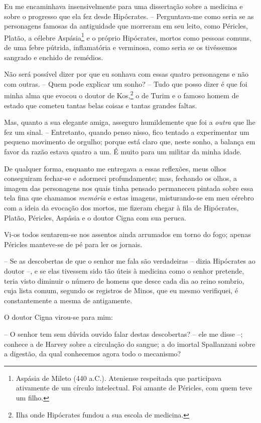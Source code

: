 Eu me encaminhava insensivelmente para uma dissertação sobre a medicina
e sobre o progresso que ela fez desde Hipócrates. -- Perguntava-me
como seria se as personagens famosas da antiguidade que morreram em seu
leito, como Péricles, Platão, a célebre Aspásia\footnote{ Aspásia de
Mileto (440 a.C.). Ateniense respeitada que participava ativamente de um
círculo intelectual. Foi amante de Péricles, com quem teve um
filho.} e o próprio Hipócrates, mortos como pessoas comuns, de uma
febre pútrida, inflamatória e verminosa, como seria se os tivéssemos
sangrado e enchido de remédios. 

Não será possível dizer por que eu sonhava com essas quatro personagens
e não com outras. -- Quem pode explicar um sonho? -- Tudo que posso
dizer é que foi minha alma que evocou o doutor de Kos,\footnote{ Ilha
onde Hipócrates fundou a sua escola de medicina.} o de Turim e o
famoso homem de estado que cometeu tantas belas coisas e tantas grandes faltas.

Mas, quanto a sua elegante amiga, asseguro humildemente que foi a
\textit{outra} que lhe fez um sinal. -- Entretanto, quando penso
nisso, fico tentado a experimentar um pequeno movimento de orgulho;
porque está claro que, neste sonho, a balança em favor da razão estava
quatro a um. É muito para um militar da minha idade. 

 De qualquer forma, enquanto me entregava a essas reflexões, meus olhos
conseguiram fechar-se e adormeci profundamente; mas, fechando os olhos,
a imagem das personagens nos quais tinha pensado permaneceu pintada
sobre essa tela fina que chamamos \textit{memória} e estas imagens,
misturando-se em meu cérebro com a ideia da evocação dos mortos, me
fizeram chegar à fila de Hipócrates, Platão, Péricles, Aspásia e o
doutor Cigna com sua peruca.

 Vi-os todos sentarem-se nos assentos ainda arrumados em torno do fogo;
apenas Péricles manteve-se de pé para ler os jornais. 

 -- Se as descobertas de que o senhor me fala são verdadeiras -- dizia
Hipócrates ao doutor --, e se elas tivessem sido tão úteis à medicina como
o senhor pretende, teria visto diminuir o número de homens que desce
cada dia ao reino sombrio, cuja lista comum, segundo os registros de
Minos, que eu mesmo verifiquei, é constantemente a mesma de
antigamente. 

 O doutor Cigna virou-se para mim: 

-- O senhor tem sem dúvida ouvido falar destas descobertas? -- ele me
disse --; conhece a de Harvey sobre a circulação do sangue; a do imortal
Spallanzani sobre a digestão, da qual conhecemos agora todo o
mecanismo?

